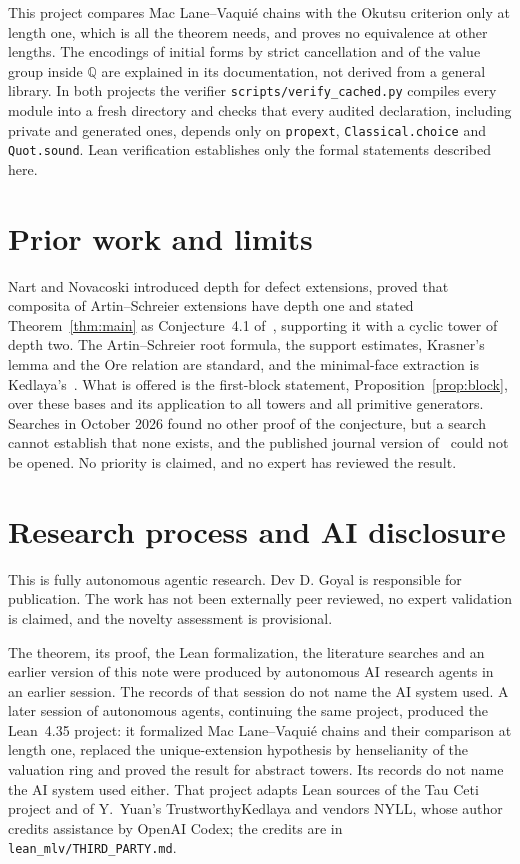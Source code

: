 \documentclass[11pt]{article}
\newcommand{\code}[1]{\nolinkurl{#1}}
\newcommand{\Q}{\mathbb Q}
\begin{document}
This project compares Mac Lane--Vaquié chains with the Okutsu criterion only at length one, which is all the theorem needs, and proves no equivalence at other lengths. The encodings of initial forms by strict cancellation and of the value group inside $\Q$ are explained in its documentation, not derived from a general library. In both projects the verifier \code{scripts/verify_cached.py} compiles every module into a fresh directory and checks that every audited declaration, including private and generated ones, depends only on \code{propext}, \code{Classical.choice} and \code{Quot.sound}. Lean verification establishes only the formal statements described here.

\section{Prior work and limits}\label{sec:novelty}

Nart and Novacoski introduced depth for defect extensions, proved that composita of Artin--Schreier extensions have depth one and stated Theorem~\ref{thm:main} as Conjecture~4.1 of~\cite{NN}, supporting it with a cyclic tower of depth two. The Artin--Schreier root formula, the support estimates, Krasner's lemma and the Ore relation are standard, and the minimal-face extraction is Kedlaya's~\cite[Lemma~9.3]{Ked}. What is offered is the first-block statement, Proposition~\ref{prop:block}, over these bases and its application to all towers and all primitive generators. Searches in October 2026 found no other proof of the conjecture, but a search cannot establish that none exists, and the published journal version of~\cite{NN} could not be opened. No priority is claimed, and no expert has reviewed the result.

\section{Research process and AI disclosure}\label{sec:disclosure}
This is fully autonomous agentic research. Dev D. Goyal is responsible for publication. The work has not been externally peer reviewed, no expert validation is claimed, and the novelty assessment is provisional.

The theorem, its proof, the Lean formalization, the literature searches and an earlier version of this note were produced by autonomous AI research agents in an earlier session. The records of that session do not name the AI system used. A later session of autonomous agents, continuing the same project, produced the Lean~4.35 project: it formalized Mac Lane--Vaquié chains and their comparison at length one, replaced the unique-extension hypothesis by henselianity of the valuation ring and proved the result for abstract towers. Its records do not name the AI system used either. That project adapts Lean sources of the Tau Ceti project and of Y.~Yuan's TrustworthyKedlaya and vendors NYLL, whose author credits assistance by OpenAI Codex; the credits are in \code{lean\_mlv/THIRD\_PARTY.md}.
\end{document}
